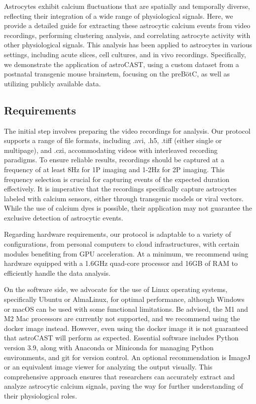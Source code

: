 
Astrocytes exhibit calcium fluctuations that are spatially and temporally diverse, reflecting their integration of a wide range of physiological signals\citep{semyanov_making_2020,smedler_frequency_2014}. Here, we provide a detailed guide for extracting these astrocytic calcium events from video recordings, performing clustering analysis, and correlating astrocyte activity with other physiological signals. This analysis has been applied to astrocytes in various settings, including acute slices, cell cultures, and in vivo recordings. Specifically, we demonstrate the application of astroCAST, using a custom dataset from a postnatal transgenic mouse brainstem, focusing on the \ac{preBötC}, as well as utilizing publicly available data.

\subsection{Requirements}
The initial step involves preparing the video recordings for analysis. Our protocol supports a range of file formats, including .avi, .h5, .tiff (either single or multipage), and .czi, accommodating videos with interleaved recording paradigms. To ensure reliable results, recordings should be captured at a frequency of at least 8Hz for \ac{1P} imaging and 1-2Hz for \ac{2P} imaging. This frequency selection is crucial for capturing events of the expected duration effectively. It is imperative that the recordings specifically capture astrocytes labeled with calcium sensors, either through transgenic models or viral vectors. While the use of calcium dyes is possible, their application may not guarantee the exclusive detection of astrocytic events.

Regarding hardware requirements, our protocol is adaptable to a variety of configurations, from personal computers to cloud infrastructures, with certain modules benefiting from GPU acceleration. At a minimum, we recommend using hardware equipped with a 1.6GHz quad-core processor and 16GB of RAM to efficiently handle the data analysis.

On the software side, we advocate for the use of Linux operating systems, specifically Ubuntu or AlmaLinux, for optimal performance, although Windows or macOS can be used with some functional limitations. Be advised, the M1 and M2 Mac processors are currently not supported, and we recommend using the docker image instead. However, even using the docker image it is not guaranteed that astroCAST will perform as expected. Essential software includes Python version 3.9, along with Anaconda or Miniconda for managing Python environments, and git for version control. An optional recommendation is ImageJ or an equivalent image viewer for analyzing the output visually. This comprehensive approach ensures that researchers can accurately extract and analyze astrocytic calcium signals, paving the way for further understanding of their physiological roles.